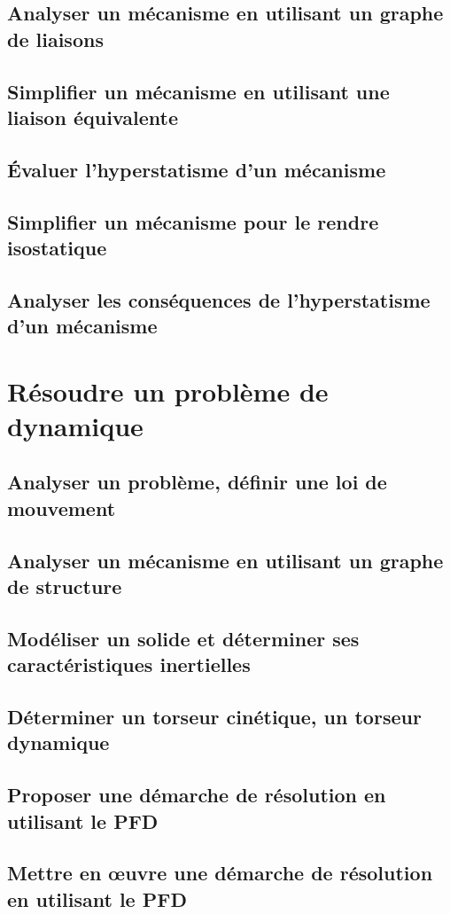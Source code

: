 \section{Analyser un mécanisme en utilisant un graphe de liaisons} 
\section{Simplifier un mécanisme en utilisant une liaison équivalente} 
\section{Évaluer l'hyperstatisme d'un mécanisme} 
\section{Simplifier un mécanisme pour le rendre isostatique} 
\section{Analyser les conséquences de l'hyperstatisme d'un mécanisme} 
\setchapterpreamble[u]{\margintoc} 
\chapter{Résoudre un problème de dynamique} 
\section{Analyser un problème, définir une loi de mouvement} 
\section{Analyser un mécanisme en utilisant un graphe de structure} 
\section{Modéliser un solide et déterminer ses caractéristiques inertielles} 
\section{Déterminer un torseur cinétique, un torseur dynamique} 
\section{Proposer une démarche de résolution en utilisant le PFD} 
\section{Mettre en œuvre une démarche de résolution en utilisant le PFD} 
\setchapterpreamble[u]{\margintoc} 
